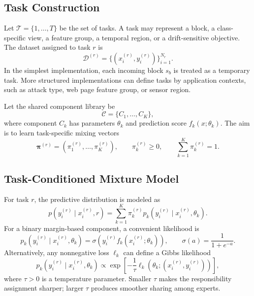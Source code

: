 ﻿\documentclass[12pt,a4paper]{article}
\newcommand{\calD}{\mathcal{D}}
\newcommand{\calC}{\mathcal{C}}
\begin{document}
\subsection{Task Construction}
Let $\mathcal{T}=\{1,\ldots,T\}$ be the set of tasks. A task may represent a
block, a class-specific view, a feature group, a temporal region, or a
drift-sensitive objective. The dataset assigned to task $r$ is
\begin{equation}
\calD^{(r)}=\{(x_i^{(r)},y_i^{(r)})\}_{i=1}^{N_r}.
\end{equation}
In the simplest implementation, each incoming block $s_b$ is treated as a
temporary task. More structured implementations can define tasks by
application contexts, such as attack type, web page feature group, or sensor
region.

Let the shared component library be
\begin{equation}
\calC=\{C_1,\ldots,C_K\},
\end{equation}
where component $C_k$ has parameters $\theta_k$ and prediction score
$f_k(x;\theta_k)$. The aim is to learn task-specific mixing vectors
\begin{equation}
\boldsymbol{\pi}^{(r)}=(\pi_1^{(r)},\ldots,\pi_K^{(r)}),
\qquad
\pi_k^{(r)}\geq0,
\qquad
\sum_{k=1}^{K}\pi_k^{(r)}=1.
\end{equation}

\subsection{Task-Conditioned Mixture Model}
For task $r$, the predictive distribution is modeled as
\begin{equation}
 p(y_i^{(r)}\mid x_i^{(r)},r)
 =\sum_{k=1}^{K}\pi_k^{(r)}
 p_k(y_i^{(r)}\mid x_i^{(r)},\theta_k).
 \label{eq:mixture_model}
\end{equation}
For a binary margin-based component, a convenient likelihood is
\begin{equation}
 p_k(y_i^{(r)}\mid x_i^{(r)},\theta_k)
 =\sigma\!\left(y_i^{(r)}f_k(x_i^{(r)};\theta_k)\right),
 \qquad
 \sigma(a)=\frac{1}{1+e^{-a}}.
 \label{eq:margin_likelihood}
\end{equation}
Alternatively, any nonnegative loss $\ell_k$ can define a Gibbs likelihood
\begin{equation}
 p_k(y_i^{(r)}\mid x_i^{(r)},\theta_k)
 \propto
 \exp\!\left[-\frac{1}{\tau}\ell_k(\theta_k;(x_i^{(r)},y_i^{(r)}))\right],
 \label{eq:gibbs_likelihood}
\end{equation}
where $\tau>0$ is a temperature parameter. Smaller $\tau$ makes the
responsibility assignment sharper; larger $\tau$ produces smoother sharing
among experts.
\end{document}
